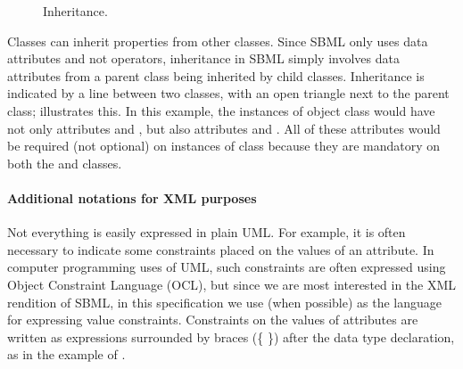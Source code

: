 \begin{wrapfigure}[10]{r}{1.9in}
  \centering
  \small
  \vspace*{-7ex}
  \caption{Inheritance.}
  \label{fig:inheritance-eg}
\end{wrapfigure}
Classes can inherit properties from other classes.  Since SBML
only uses data attributes and not operators, inheritance in SBML
simply involves data attributes from a parent class being
inherited by child classes.  Inheritance is indicated by a line
between two classes, with an open triangle next to the parent
class;  illustrates this.  In this
example, the instances of object class  would have
not only attributes  and , but also attributes
 and .  All of these attributes would be
required (not optional) on instances of class 
because they are mandatory on both the  and
 classes.



\paragraph{Additional notations for XML purposes}

Not everything is easily expressed in plain UML.  For example, it
is often necessary to indicate some constraints placed on the
values of an attribute.  In computer programming uses of UML, such
constraints are often expressed using Object Constraint Language
(OCL), but since we are most interested in the XML rendition of
SBML, in this specification we use \xmlschemaone (when possible)
as the language for expressing value constraints.  Constraints on
the values of attributes are written as expressions surrounded by
braces (\{ \}) after the data type declaration, as in the example
of .

